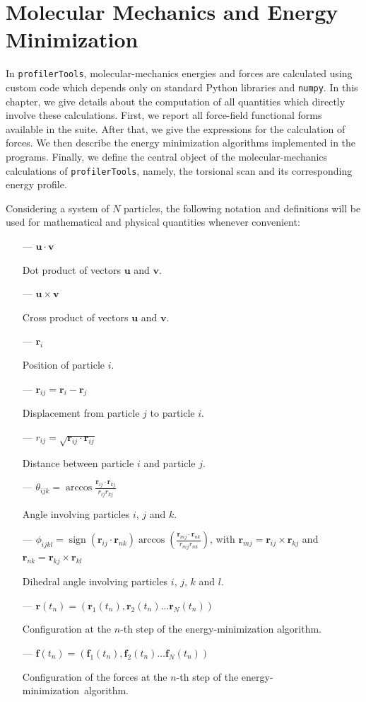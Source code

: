 \documentclass[10pt,a4paper,openany]{memoir}
\numberwithin{equation}{section}
\DeclareMathOperator{\sign}{sign}
\newcommand{\rsub}[1]{\mathbf{r}_{#1}}
\newcommand{\fsub}[1]{\mathbf{f}_{#1}}
\newcommand{\profilertools}[0]{\texttt{profilerTools}}
\begin{document}
\chapter{Molecular Mechanics and Energy Minimization}
\label{chap:mm}

In \profilertools{}, molecular-mechanics energies and forces are
calculated using custom code which depends only on standard Python
libraries and \texttt{numpy}.
%
In this chapter, we give details about the computation of all quantities which directly involve these calculations.
First, we report all force-field functional forms available in the suite.
After that, we give the expressions for the calculation of forces.
We then describe the energy minimization algorithms implemented in the programs.
Finally, we define the central object of the molecular-mechanics calculations of \profilertools{}, namely, the torsional scan and its corresponding energy profile.

Considering a system of $N$ particles, the following notation and definitions will be used for mathematical and physical quantities whenever convenient:

\begin{itemize}
\item[---] $\mathbf{u} \cdot \mathbf{v}$ \par  Dot product of vectors $\mathbf{u}$ and $\mathbf{v}$.
\item[---] $\mathbf{u} \times \mathbf{v}$ \par  Cross product of vectors $\mathbf{u}$ and $\mathbf{v}$.
\item[---] $\mathbf{r}_i$ \par  Position of particle $i$.
\item[---] $\mathbf{r}_{ij} = \mathbf{r}_i - \mathbf{r}_j$ \par  Displacement from particle $j$ to particle $i$.
\item[---] $r_{ij} = \sqrt{\mathbf{r}_{ij} \cdot \mathbf{r}_{ij}}$ \par  Distance between particle $i$ and particle $j$.
\item[---] $\theta_{ijk} = \arccos{\frac{\mathbf{r}_{ij} \cdot \mathbf{r}_{kj}}{r_{ij}r_{kj}}}$  \par  Angle involving particles $i$, $j$ and $k$.
\item[---] $\phi_{ijkl} = \sign{(\rsub{ij} \cdot \rsub{nk})} \arccos{\left( \frac{\rsub{mj} \cdot \rsub{nk}}{r_{mj}r_{nk}} \right)}$, with $\rsub{mj} = \rsub{ij}\times\rsub{kj}$ and $\rsub{nk} = \rsub{kj}\times\rsub{kl}$
  \par  Dihedral angle involving particles $i$, $j$, $k$ and $l$.
\item[---] $\mathbf{r}(t_n) = (\rsub{1}(t_n),\rsub{2}(t_n)\ldots\rsub{N}(t_n))$
  \par
  
  Configuration at the $n$-th step of the energy-minimization algorithm.
\item[---] $\mathbf{f}(t_n) = (\fsub{1}(t_n),\fsub{2}(t_n)\ldots\fsub{N}(t_n))$
  \par
  Configuration of the forces at the $n$-th step of the energy-minimization~algorithm.
\end{itemize}
\end{document}
